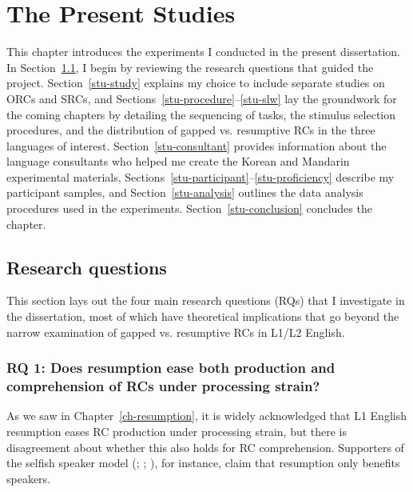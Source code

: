 
\chapter{The Present Studies}\label{ch-study}


This chapter introduces the experiments I conducted in the present dissertation. In Section~\ref{stu-rq}, I begin by reviewing the research questions that guided the project. Section~\ref{stu-study} explains my choice to include separate studies on ORCs and SRCs, and Sections~\ref{stu-procedure}--\ref{stu-slw} lay the groundwork for the coming chapters by detailing the sequencing of tasks, the stimulus selection procedures, and the distribution of gapped vs. resumptive RCs in the three languages of interest. Section~\ref{stu-consultant} provides information about the language consultants who helped me create the Korean and Mandarin experimental materials, Sections~\ref{stu-participant}--\ref{stu-proficiency} describe my participant samples, and Section~\ref{stu-analysis} outlines the data analysis procedures used in the experiments. Section~\ref{stu-conclusion} concludes the chapter.

\section{Research questions}\label{stu-rq}

This section lays out the four main research questions (RQs) that I investigate in the dissertation, most of which have theoretical implications that go beyond the narrow examination of gapped vs. resumptive RCs in L1/L2 English.

\subsection{RQ 1: Does resumption ease both production and comprehension of RCs under processing strain?}

As we saw in Chapter~\ref{ch-resumption}, it is widely acknowledged that L1 English resumption eases RC production under processing strain, but there is disagreement about whether this also holds for RC comprehension. Supporters of the selfish speaker model (\cite{ferreira.swets2005}; \cite{morgan.etal2020}; \cite{polinsky.etal2013}), for instance, claim that resumption only benefits speakers.

